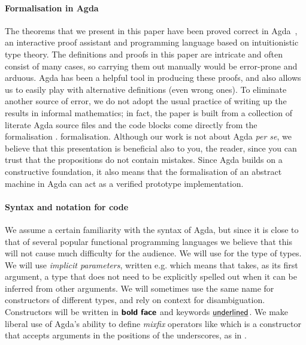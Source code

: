 \documentclass{article}
\theoremstyle{definition}
\newcommand{\Conid}[1]{\mathit{#1}}
\newcommand{\Varid}[1]{\mathit{#1}}
\renewcommand\Varid[1]{\mathord{\textsf{#1}}}
\let\Conid\Varid
\newcommand\Keyword[1]{\textsf{\textbf{#1}}}
\newcommand\MyConid[1]{\mathord{\textsf{\textbf{#1}}}}
\renewcommand\Keyword[1]{\textsf{\underline{#1}}}
\renewcommand\Varid[1]{\textsf{#1}}
\newcommand{\dummy}{\Varid{\_}}
\begin{document}
\paragraph*{Formalisation in Agda}
The theorems that we present in this paper have been proved correct in
Agda~\cite{norell:thesis}, an interactive proof assistant and programming
language based on intuitionistic type theory.  The definitions and proofs in
this paper are intricate and often consist of many cases, so carrying them out manually would
be error-prone and arduous.  Agda has been a helpful tool in producing these
proofs, and also allows us to easily play with alternative definitions (even wrong
ones). To eliminate another source of error, we do not adopt the usual practice
of writing up the results in informal mathematics; in fact, the paper is built
from a collection of literate Agda source files and the code blocks come
directly from the
\ifnotfullversion
formalisation \cite{SourceCode}.
\else
formalisation.
\fi
Although our work is not
about Agda \emph{per se}, we believe that this presentation is beneficial also
to you, the reader, since you can trust that the propositions do not contain
mistakes.
Since Agda builds on a constructive foundation, it also means that the
formalisation of an abstract machine in Agda can act as a verified prototype
implementation.
\iffullversion
\paragraph*{Syntax and notation for code}
We assume a certain familiarity with the syntax of Agda, but since it is close
to that of several popular functional programming languages we believe that
this will not cause much difficulty for the audience.
We will use {\textsmaller[.5]{\ensuremath{\star}}} for the type of types.
We will use \emph{implicit parameters}, written e.g. {\textsmaller[.5]{\ensuremath{\Varid{f}\;\mathbin{:}\;\{\mskip1.5mu \Conid{A}\;\mathbin{:}\;\star\mskip1.5mu\}\;\Varid{→}\;\Varid{...}}}}
which means that {\textsmaller[.5]{\ensuremath{\Varid{f}}}} takes, as its first argument, a type {\textsmaller[.5]{\ensuremath{\Conid{A}}}} that does not
need to be explicitly spelled out when it can be inferred from other
arguments.
We will sometimes use the same name for constructors of different types, and
rely on context for disambiguation.
Constructors will be written in $\MyConid{bold face}$ and keywords $\Keyword{underlined}$.
We make liberal use of Agda's ability to define \emph{mixfix} operators like
{\textsmaller[.5]{\ensuremath{{\MyConid{if0}\dummy\MyConid{then}\dummy\MyConid{else}\dummy}}}} which is a constructor that accepts arguments
in the positions of the underscores, as in {\textsmaller[.5]{\ensuremath{\MyConid{if0}\;\Varid{b}\;\MyConid{then}\;\Varid{t}\;\MyConid{else}\;\Varid{f}}}}.
\fi
\end{document}
